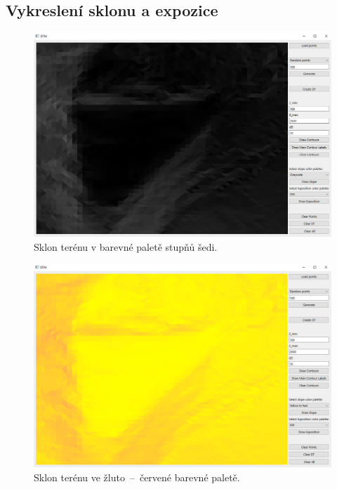 \documentclass[a4paper, 12pt, oneside, titlepage]{article} %
\begin{document}
\subsection{Vykreslení sklonu a expozice}

\begin{figure}[!htb]
	\centering
	\includegraphics[scale=0.45]{obrazky/sklon_gs.png} 
	\caption{Sklon terénu v barevné paletě stupňů šedi.
	}
	\label{fig:sklon_gs}
\end{figure} 
\FloatBarrier

\begin{figure}[!htb]
	\centering
	\includegraphics[scale=0.45]{obrazky/sklon_yr.png} 
	\caption{Sklon terénu ve žluto~--~červené barevné paletě.
	}
	\label{fig:sklon_yr}
\end{figure} 
\FloatBarrier
\end{document}
